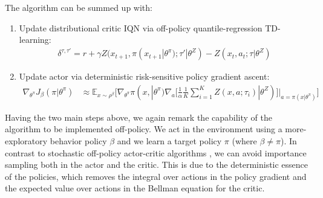 The algorithm can be summed up with:

\begin{enumerate}
    \item Update distributional critic IQN via off-policy quantile-regression TD-learning:
    \begin{align}
        \delta^{\tau, \tau'} = r + \gamma Z(x_{t+1},\pi(x_{t+1}|\theta^\pi);\tau'| \theta^Z)-Z(x_t,a_t;\tau|\theta^Z) \nonumber
    \end{align}
    \item Update actor via deterministic risk-sensitive policy gradient ascent:
    \begin{align}
        \nabla_{\theta^\pi} J_\beta(\pi | \theta^\pi) &\approx \mathbb E_{x \sim \rho^\beta} 
    \big [\nabla_{\theta^\pi} \pi(x,| \theta^\pi) \nabla_a  [\frac{1}{\alpha} \frac{1}{K}
    \sum_{i=1}^K Z(x,a; \tau_i) | \theta^Z)]|_{a=\pi(x| \theta^\pi)}  \big] \nonumber
    \end{align}
\end{enumerate}

Having the two main steps above, we again remark the capability of the algorithm to be
implemented off-policy. We act in the environment using 
a more-exploratory behavior policy $\beta$ and we learn a
target policy $\pi$ (where $\beta \neq \pi$).
In contrast to stochastic off-policy actor-critic algorithms \citep{Degris2012}, we can avoid
importance sampling both in the actor and the critic.
This is due to the deterministic essence of the policies, which removes the integral over actions
in the policy gradient and the expected value over actions in the Bellman equation for the critic.
